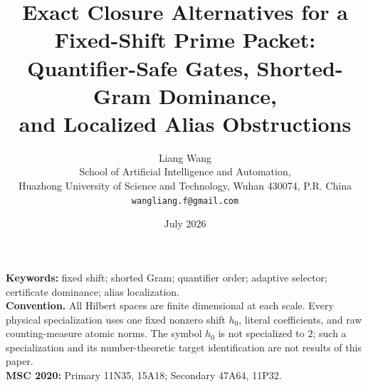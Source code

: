 \documentclass[11pt]{article}
\title{Exact Closure Alternatives for a Fixed-Shift Prime Packet:\\
Quantifier-Safe Gates, Shorted-Gram Dominance,\\
and Localized Alias Obstructions}
\author{Liang Wang\\
School of Artificial Intelligence and Automation,\\
Huazhong University of Science and Technology, Wuhan 430074, P.R. China\\
\texttt{wangliang.f@gmail.com}}
\date{July 2026}
\theoremstyle{remark}
\begin{document}
\maketitle


\noindent\textbf{Keywords:} fixed shift; shorted Gram; quantifier order;
adaptive selector; certificate dominance; alias localization.\\[0.5em]
\noindent\textbf{Convention.} All Hilbert spaces are finite dimensional at
each scale.  Every physical specialization uses one fixed nonzero shift
\(h_0\), literal coefficients, and raw counting-measure atomic norms.
The symbol \(h_0\) is not specialized to \(2\); such a specialization and
its number-theoretic target identification are not results of this paper.\\[0.5em]
\noindent\textbf{MSC 2020:} Primary 11N35, 15A18; Secondary 47A64, 11P32.













\begingroup
\small


\endgroup
\end{document}
